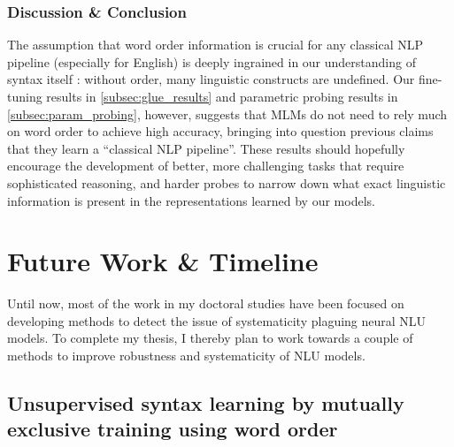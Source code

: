 \documentclass[12pt]{article}
\begin{document}
\subsubsection{Discussion \& Conclusion}

The assumption that word order information is crucial for any classical NLP pipeline (especially for English) is deeply ingrained in our understanding of syntax itself \citep{chomsky1957syntactic}: without order, many linguistic constructs are undefined. %
Our fine-tuning results in \autoref{subsec:glue_results} and parametric probing results in \autoref{subsec:param_probing}, however, suggests that MLMs do not need to rely much on word order to achieve high accuracy, bringing into question previous claims that they learn a ``classical NLP pipeline''. These results should hopefully encourage the development of better, more challenging tasks that require sophisticated reasoning, and harder probes to narrow down what exact linguistic information is present in the representations learned by our models.





\section{Future Work \& Timeline}

Until now, most of the work in my doctoral studies have been focused on developing methods to detect the issue of systematicity plaguing neural NLU models. To complete my thesis, I thereby plan to work towards a couple of methods to improve robustness and systematicity of NLU models.

\subsection{Unsupervised syntax learning by mutually exclusive training using word order}
\end{document}
